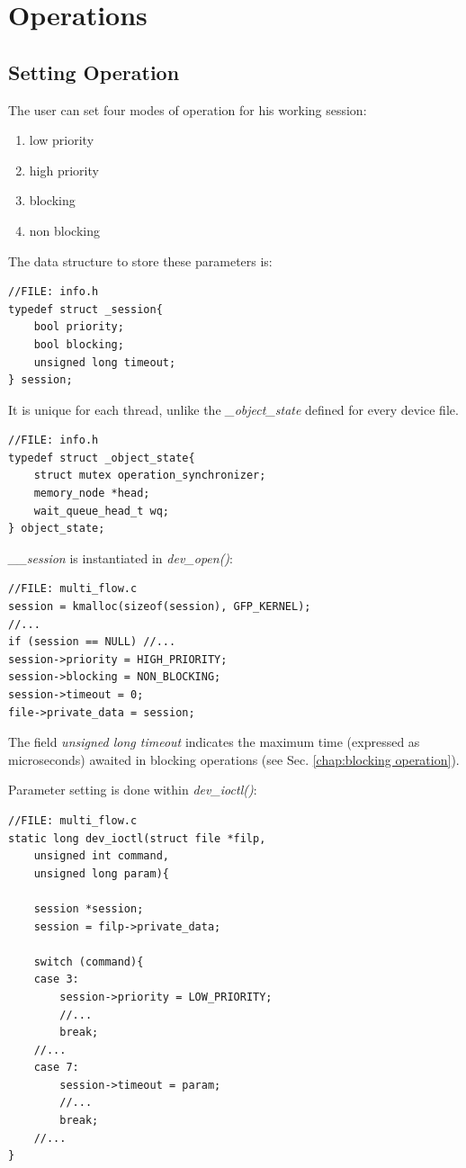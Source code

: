 \documentclass[12pt]{report}
\begin{document}
\chapter{Operations}
\section{Setting Operation}

The user can set four modes of operation for his working session: 

\begin{enumerate}
	\itemsep0em 
	\item low priority
	\item high priority
	\item blocking
	\item non blocking
\end{enumerate}

The data structure to store these parameters is:

\begin{lstlisting}
//FILE: info.h
typedef struct _session{
	bool priority;       
	bool blocking;
	unsigned long timeout;
} session;
\end{lstlisting}

It is unique for each thread, unlike the \emph{\_object\_state} defined for every device file.

\begin{lstlisting}
//FILE: info.h
typedef struct _object_state{
	struct mutex operation_synchronizer;
	memory_node *head;
	wait_queue_head_t wq;
} object_state;
\end{lstlisting}

\emph{\_\_session} is instantiated in \emph{dev\_open()}:

\begin{lstlisting}
//FILE: multi_flow.c
session = kmalloc(sizeof(session), GFP_KERNEL);
//...
if (session == NULL) //...
session->priority = HIGH_PRIORITY;
session->blocking = NON_BLOCKING;
session->timeout = 0;
file->private_data = session;
\end{lstlisting}

The field \emph{unsigned long timeout} indicates the maximum time (expressed as microseconds) awaited in blocking operations (see Sec. \ref{chap:blocking operation}). 

Parameter setting is done within \emph{dev\_ioctl()}:

\begin{lstlisting}
//FILE: multi_flow.c
static long dev_ioctl(struct file *filp, 
	unsigned int command, 
	unsigned long param){

	session *session;
	session = filp->private_data;
	
	switch (command){
	case 3:
		session->priority = LOW_PRIORITY;
		//...
		break;
	//...
	case 7:
		session->timeout = param;
		//...
		break;
	//...
}
\end{lstlisting}
\end{document}

